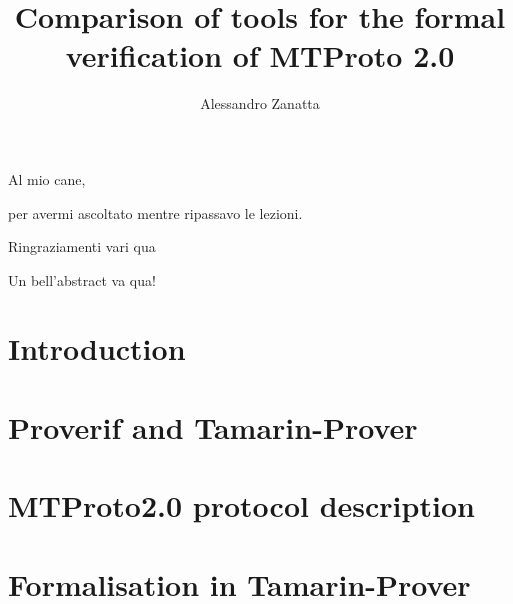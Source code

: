 \documentclass[target=bach,aauheader=]{thud}
\title{Comparison of tools for the formal verification of MTProto 2.0}
\author{Alessandro Zanatta}
\begin{document}
\maketitle

\begin{dedication}
	Al mio cane,\par per avermi ascoltato mentre ripassavo le lezioni.
\end{dedication}

\acknowledgements
Ringraziamenti vari qua

\abstract
Un bell'abstract va qua!

\tableofcontents



\mainmatter

\chapter{Introduction}


\chapter{Proverif and Tamarin-Prover}


\chapter{MTProto2.0 protocol description}


\chapter{Formalisation in Tamarin-Prover}

\appendix

% 

\backmatter




\end{document}
